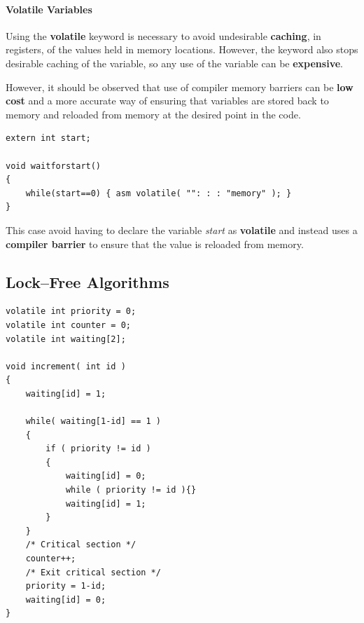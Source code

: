 \documentclass[12pt,a4paper]{report}
\begin{document}
\paragraph*{Volatile Variables}
Using the \textbf{volatile} keyword is necessary to avoid undesirable \textbf{caching}, in registers, of the values held in memory locations. However, the keyword also stops desirable caching of the variable, so any use of the variable can be \textbf{expensive}.
\par
However, it should be observed that use of compiler memory barriers can be \textbf{low cost} and a more accurate way of ensuring that variables are stored back to memory and reloaded from memory at the desired point in the code.
\begin{lstlisting}
extern int start;

void waitforstart()
{
	while(start==0) { asm volatile( "": : : "memory" ); }
}

\end{lstlisting}
This case avoid having to declare the variable \textit{start} as \textbf{volatile} and instead uses a \textbf{compiler barrier} to ensure that the value is reloaded from memory.
\subsection*{Lock--Free Algorithms}
\begin{lstlisting}
volatile int priority = 0;
volatile int counter = 0;
volatile int waiting[2];

void increment( int id )
{
	waiting[id] = 1;

	while( waiting[1-id] == 1 )
	{
		if ( priority != id )
		{
			waiting[id] = 0;
			while ( priority != id ){}
			waiting[id] = 1;
		}
	}
	/* Critical section */
	counter++;
	/* Exit critical section */
	priority = 1-id;
	waiting[id] = 0;
}
\end{lstlisting}
\end{document}
